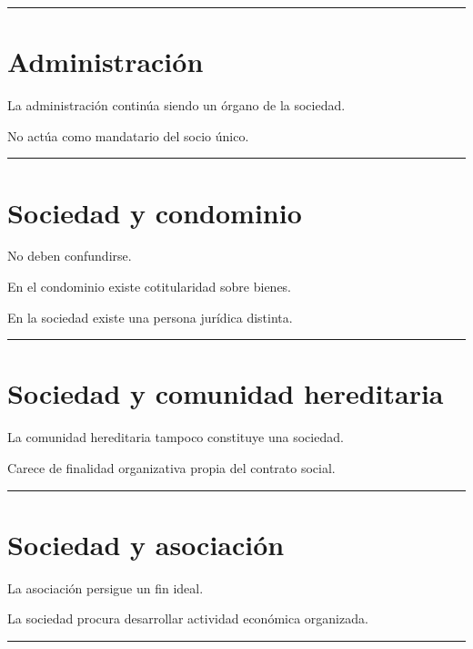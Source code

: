 \documentclass[
  spanish,
  letterpaper,
  DIV=11,
  numbers=noendperiod]{scrartcl}
\begin{document}
\begin{center}\rule{0.5\linewidth}{0.5pt}\end{center}

\section{Administración}\label{administraciuxf3n-1}

La administración continúa siendo un órgano de la sociedad.

No actúa como mandatario del socio único.

\begin{center}\rule{0.5\linewidth}{0.5pt}\end{center}

\section{Sociedad y condominio}\label{sociedad-y-condominio}

No deben confundirse.

En el condominio existe cotitularidad sobre bienes.

En la sociedad existe una persona jurídica distinta.

\begin{center}\rule{0.5\linewidth}{0.5pt}\end{center}

\section{Sociedad y comunidad
hereditaria}\label{sociedad-y-comunidad-hereditaria}

La comunidad hereditaria tampoco constituye una sociedad.

Carece de finalidad organizativa propia del contrato social.

\begin{center}\rule{0.5\linewidth}{0.5pt}\end{center}

\section{Sociedad y asociación}\label{sociedad-y-asociaciuxf3n-1}

La asociación persigue un fin ideal.

La sociedad procura desarrollar actividad económica organizada.

\begin{center}\rule{0.5\linewidth}{0.5pt}\end{center}
\end{document}
